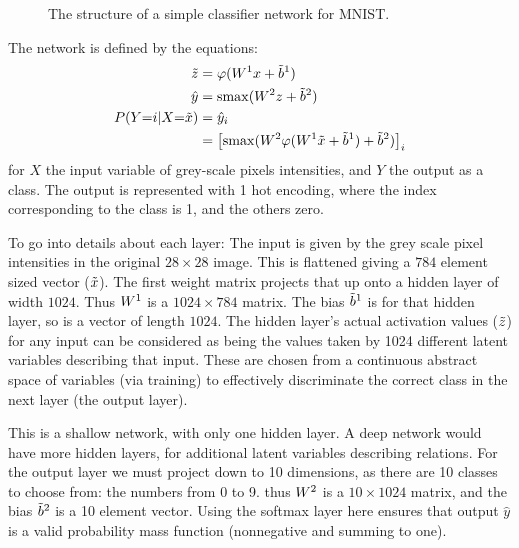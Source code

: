 \documentclass[12pt,parskip]{komatufte}
\begin{document}
\begin{figure}
	\caption{The structure of a simple classifier network for MNIST.}
	\label{fig:mnistnetwork}
	
\end{figure}

The network is defined by the equations:
\begin{align}
\v z&=\varphi(\d W_1 x + \dv b_1) \\
\hat{y}&=\softmax(\d W_2 z + \dv b_2) \\
P(Y{=}i{\mid}X{=}\v x) &= \hat{y}_i \\
&= \left[\softmax(\d W_2 \varphi(\d W_1 \v x + \dv b_1)+\dv b_2)\right]_i
\end{align}
for $X$ the input variable of grey-scale pixels intensities, and $Y$ the output as a class.
The output is represented with 1 hot encoding, where the index corresponding to the class is 1, and the others zero.



To go into details about each layer:
The input is given by the grey scale pixel intensities in the original $28\times 28$ image.
This is flattened giving a $784$ element sized vector ($\tilde{x}$).
The first weight matrix projects that up onto a hidden layer  of width $1024$.
Thus $\d W_1$ is a $1024\times 784$ matrix.
The bias $\d {\v b}_1$ is for that hidden layer, so is a vector of length $1024$.
The hidden layer's actual activation values ($\tilde{z}$) for any input can be considered as being the values taken by 1024 different latent variables describing that input.
These are chosen  from a continuous abstract space of variables (via training) to effectively discriminate the correct class in the next layer (the output layer).

This is a shallow network, with only one hidden layer.
A deep network would have more hidden layers, for additional latent variables describing relations.
For the output layer we must project down to 10 dimensions, as there are 10 classes to choose from: the numbers from 0 to 9.
thus $\d W_2$ is a $10 \times 1024$ matrix,
and the bias $\dv b_2$ is a 10 element vector.
Using the softmax layer here ensures that output $\hat{y}$ is a valid probability mass function (nonnegative and summing to one).
\end{document}
